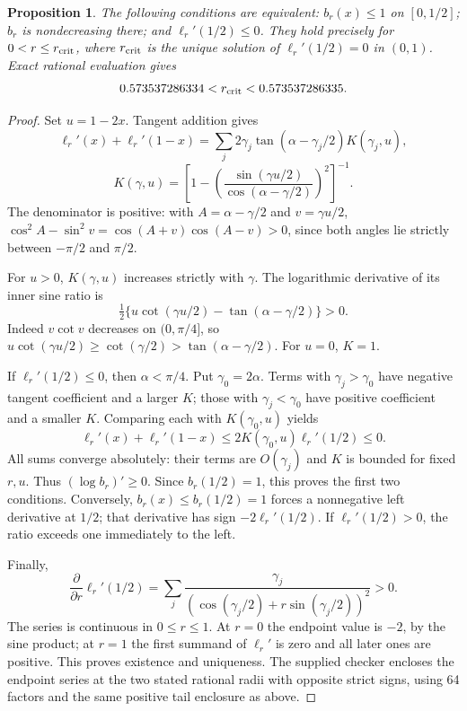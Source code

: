 \documentclass[11pt,a4paper]{article}
\newtheorem{proposition}[theorem]{Proposition}
\theoremstyle{remark}\newtheorem*{ednote}{Editorial note (ProveIt, 2026-10-01)}
\begin{document}
\begin{proposition}\label{prop:envelope}
The following conditions are equivalent: $b_r(x)\le1$ on $[0,1/2]$; $b_r$ is nondecreasing there; and $\ell_r'(1/2)\le0$. They hold precisely for $0<r\le r_{\rm crit}$, where $r_{\rm crit}$ is the unique solution of $\ell_r'(1/2)=0$ in $(0,1)$. Exact rational evaluation gives
\[
 0.573537286334<r_{\rm crit}<0.573537286335.
\]
\end{proposition}
\begin{proof}
Set $u=1-2x$. Tangent addition gives
\[
 \ell_r'(x)+\ell_r'(1-x)
 =\sum_j2\gamma_j\tan(\alpha-\gamma_j/2)K(\gamma_j,u),
\]
\[
 K(\gamma,u)=\left[1-
 \left(\frac{\sin(\gamma u/2)}{\cos(\alpha-\gamma/2)}\right)^2\right]^{-1}.
\]
The denominator is positive: with $A=\alpha-\gamma/2$ and $v=\gamma u/2$,
$\cos^2A-\sin^2v=\cos(A+v)\cos(A-v)>0$, since both angles lie strictly between $-\pi/2$ and $\pi/2$.

For $u>0$, $K(\gamma,u)$ increases strictly with $\gamma$. The logarithmic derivative of its inner sine ratio is
\[
 \tfrac12\{u\cot(\gamma u/2)-\tan(\alpha-\gamma/2)\}>0.
\]
Indeed $v\cot v$ decreases on $(0,\pi/4]$, so
$u\cot(\gamma u/2)\ge\cot(\gamma/2)>\tan(\alpha-\gamma/2)$.
For $u=0$, $K=1$.

If $\ell_r'(1/2)\le0$, then $\alpha<\pi/4$. Put $\gamma_0=2\alpha$.
Terms with $\gamma_j>\gamma_0$ have negative tangent coefficient and a larger $K$; those with $\gamma_j<\gamma_0$ have positive coefficient and a smaller $K$. Comparing each with $K(\gamma_0,u)$ yields
\[
 \ell_r'(x)+\ell_r'(1-x)
 \le2K(\gamma_0,u)\ell_r'(1/2)\le0.
\]
All sums converge absolutely: their terms are $O(\gamma_j)$ and $K$ is bounded for fixed $r,u$. Thus $(\log b_r)'\ge0$. Since $b_r(1/2)=1$, this proves the first two conditions. Conversely, $b_r(x)\le b_r(1/2)=1$ forces a nonnegative left derivative at $1/2$; that derivative has sign $-2\ell_r'(1/2)$. If $\ell_r'(1/2)>0$, the ratio exceeds one immediately to the left.

Finally,
\[
 \frac{\partial}{\partial r}\ell_r'(1/2)
 =\sum_j\frac{\gamma_j}
 {(\cos(\gamma_j/2)+r\sin(\gamma_j/2))^2}>0.
\]
The series is continuous in $0\le r\le1$. At $r=0$ the endpoint value is $-2$, by the sine product; at $r=1$ the first summand of $\ell_r'$ is zero and all later ones are positive. This proves existence and uniqueness. The supplied checker encloses the endpoint series at the two stated rational radii with opposite strict signs, using 64 factors and the same positive tail enclosure as above.
\end{proof}
\end{document}
